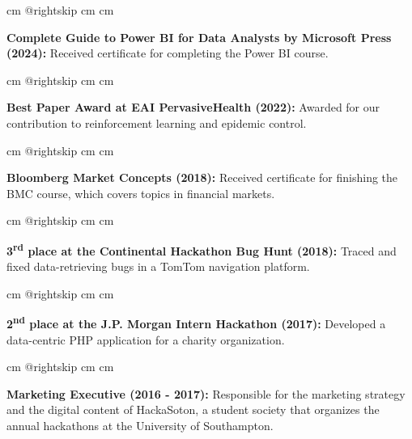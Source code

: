 \documentclass[10pt, letterpaper]{article}
\begin{document}
        \begingroup{} cm
        \advance\csname @rightskip cm
        \advance{} cm

        \textbf{Complete Guide to Power BI for Data Analysts by Microsoft Press (2024):} Received certificate for completing the Power BI course. \par\endgroup

        \vspace{0.2 cm}
        \begingroup{} cm
        \advance\csname @rightskip cm
        \advance{} cm

        \textbf{Best Paper Award at EAI PervasiveHealth (2022):} Awarded for our contribution to reinforcement learning and epidemic control. \par\endgroup

        \vspace{0.2 cm}
        \begingroup{} cm
        \advance\csname @rightskip cm
        \advance{} cm

        \textbf{Bloomberg Market Concepts (2018):} Received certificate for finishing the BMC course, which covers topics in financial markets. \par\endgroup

        \vspace{0.2 cm}
        \begingroup{} cm
        \advance\csname @rightskip cm
        \advance{} cm

        \textbf{3\textsuperscript{rd} place at the Continental Hackathon Bug Hunt (2018):} Traced and fixed data-retrieving bugs in a TomTom navigation platform. \par\endgroup

        \vspace{0.2 cm}
        \begingroup{} cm
        \advance\csname @rightskip cm
        \advance{} cm

        \textbf{2\textsuperscript{nd} place at the J.P. Morgan Intern Hackathon (2017):} Developed a data-centric PHP application for a charity organization. \par\endgroup

        \vspace{0.2 cm}
        \begingroup{} cm
        \advance\csname @rightskip cm
        \advance{} cm

        \textbf{Marketing Executive (2016 - 2017):} Responsible for the marketing strategy and the digital content of HackaSoton, a student society that organizes the annual hackathons at the University of Southampton. \par\endgroup
\end{document}
